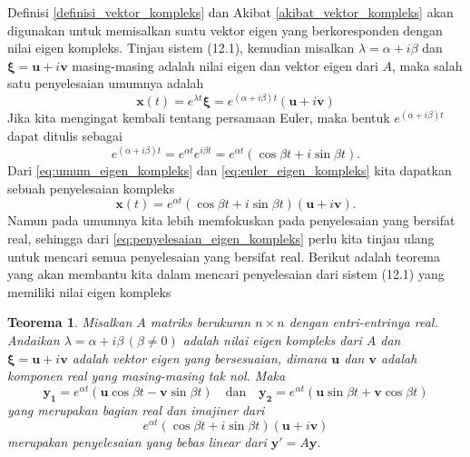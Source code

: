 \documentclass[a4paper]{article}
\theoremstyle{definisi}
\newtheorem{teorema}{Teorema}[section]
\newcommand{\bfxi}{\boldsymbol{\xi}}
\numberwithin{equation}{section}
\begin{document}
  Definisi \ref{definisi_vektor_kompleks} dan Akibat \ref{akibat_vektor_kompleks} akan digunakan untuk memisalkan suatu vektor eigen yang berkoresponden dengan nilai eigen kompleks. Tinjau sistem (12.1), kemudian misalkan $\lambda=\alpha+i\beta$ dan $\bfxi=\mathbf{u}+i\mathbf{v}$ masing-masing adalah nilai eigen dan vektor eigen dari $A$, maka salah satu penyelesaian umumnya adalah
  \begin{equation}\label{eq:umum_eigen_kompleks}
    \mathbf{x}(t) = e^{\lambda t}\bfxi = e^{(\alpha+i\beta)t}(\mathbf{u}+i\mathbf{v})
  \end{equation}
  Jika kita mengingat kembali tentang persamaan Euler, maka bentuk $e^{(\alpha+i\beta)t}$ dapat ditulis sebagai
  \begin{equation}\label{eq:euler_eigen_kompleks}
    e^{(\alpha+i\beta)t} =e^{\alpha t}e^{i\beta t}=e^{\alpha t}(\cos\beta t + i\sin\beta t).
  \end{equation}
  Dari \eqref{eq:umum_eigen_kompleks} dan \eqref{eq:euler_eigen_kompleks} kita dapatkan sebuah penyelesaian kompleks
  \begin{equation}\label{eq:penyelesaian_eigen_kompleks}
    \mathbf{x}(t) = e^{\alpha t}(\cos\beta t + i\sin\beta t)(\mathbf{u}+i\mathbf{v}).
  \end{equation}
  Namun pada umumnya kita lebih memfokuskan pada penyelesaian yang bersifat real, sehingga dari \eqref{eq:penyelesaian_eigen_kompleks} perlu kita tinjau ulang untuk mencari semua penyelesaian yang bersifat real. Berikut adalah teorema yang akan membantu kita dalam mencari penyelesaian dari sistem (12.1) yang memiliki nilai eigen kompleks

  \begin{teorema}\label{thm:penyelesaian_nilai_eigen_kompleks}
    Misalkan $A$ matriks berukuran $n\times n$ dengan entri-entrinya real. Andaikan $\lambda = \alpha + i\beta\,(\beta \ne 0)$ adalah nilai eigen kompleks dari $A$ dan $\bfxi=\mathbf{u}+i\mathbf{v}$ adalah vektor eigen yang bersesuaian, dimana $\mathbf{u}$ dan $\mathbf{v}$ adalah komponen real yang masing-masing tak nol. Maka 
    \[\mathbf{y_1} = e^{\alpha t}(\mathbf{u}\cos\beta t - \mathbf{v}\sin\beta t)\quad\text{dan}\quad \mathbf{y_2} = e^{\alpha t}(\mathbf{u}\sin\beta t + \mathbf{v}\cos\beta t)\]
    yang merupakan bagian real dan imajiner dari
    \begin{equation}
      e^{\alpha t}(\cos\beta t + i\sin\beta t)(\mathbf{u} + i\mathbf{v}) 
    \end{equation}
    merupakan penyelesaian yang bebas linear dari $\mathbf{y'}=A\mathbf{y}$.
  \end{teorema}
\end{document}
